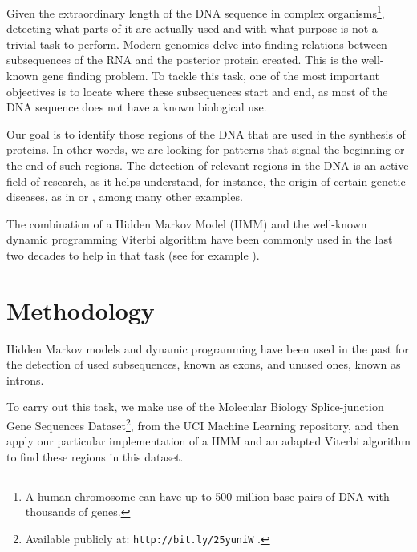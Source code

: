 \documentclass[a4paper, 11pt]{article} %
\begin{document}
Given the extraordinary length of the DNA sequence in complex organisms\footnote{A human chromosome can have up to 500 million base pairs of DNA with thousands of genes.}, detecting what parts of it are actually used and with what purpose is not a trivial task to perform. Modern genomics delve into finding relations between subsequences of the RNA and the posterior protein created. This is the well-known gene finding problem. To tackle this task, one of the most important objectives is to locate where these subsequences start and end, as most of the DNA sequence does not have a known biological use.

Our goal is to identify those regions of the DNA that are used in the synthesis of proteins. In other words, we are looking for patterns that signal the beginning or the end of such regions. The detection of relevant regions in the DNA is an active field of research, as it helps understand, for instance, the origin of certain genetic diseases, as in \cite{scheper} or \cite{calon}, among many other examples.

The combination of a Hidden Markov Model (HMM) and the well-known dynamic programming Viterbi algorithm have been commonly used in the last two decades to help in that task (see for example \cite{henderson}).

\section*{Methodology}

Hidden Markov models and dynamic programming have been used in the past for the detection of used subsequences, known as exons, and unused ones, known as introns. 

To carry out this task, we make use of the Molecular Biology Splice-junction Gene Sequences Dataset\footnote{Available publicly at: \texttt{http://bit.ly/25yuniW} \cite{lichman}.}, from the UCI Machine Learning repository, and then apply our particular implementation of a HMM and an adapted Viterbi algorithm to find these regions in this dataset.
\end{document}
